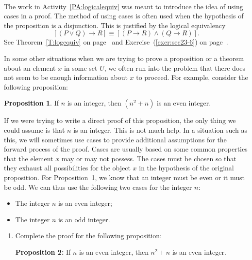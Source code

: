 \begin{previewactivity}\label{PA:cases} \hfill \\
The work in \typeu Activity~\ref*{PA:logicalequiv} was meant to introduce the idea of using cases in a proof.  
The method of using cases is often used when the hypothesis of the proposition is a disjunction.  This is justified by the logical equivalency 
\[
\left[ \left( {P \vee Q} \right) \to R \right] \equiv \left[ \left( {P \to R} \right) \wedge \left( {Q \to R} \right) \right].
\]
See Theorem~\ref{T:logequiv} on page~\pageref{T:logequiv} and Exercise~(\ref{exer:sec23-6}) on page~\pageref{exer:sec23-6}.

%
%
In some other situations when we are trying to prove a proposition or a theorem about an element $x$ in some set $U$, we often run into the problem that there does not seem to be enough information about $x$ to proceed.  For example, consider the following proposition:

\newpar
\textbf{Proposition 1}.  If $n$ is an integer, then $\left( n^2 + n \right)$ is an even integer. 

\newpar
If we were trying to write a direct proof of this proposition, the only thing we could assume is that $n$ is an integer.  This is not much help.  In a situation such as this, we will sometimes use cases to provide additional assumptions for the forward process of the proof.  Cases are usually based on some common properties that the element $x$ may or may not possess.  The cases must be chosen so that they exhaust all possibilities for the object $x$ in the hypothesis of the original proposition.  For Proposition~1, we know that an integer must be even or it must be odd.  We can thus use the following two cases for the integer $n$:
\begin{itemize}
  \item The integer  $n$  is an even integer;
  \item The integer  $n$  is an odd integer.
\end{itemize}

\begin{enumerate}
\item Complete the proof for the following proposition:

\textbf{Proposition 2:}  If  $n$  is an even integer, then  $n^2  + n$ is an even integer.


\end{enumerate}
\end{previewactivity}
